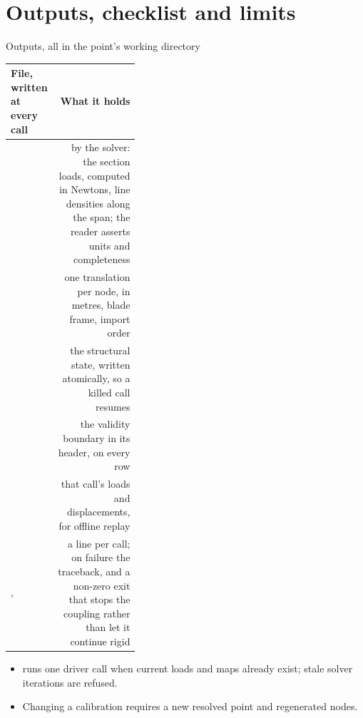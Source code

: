 %
%

\section{Outputs, checklist and limits}

\begin{frame}{Outputs, all in the point's working directory}
\relax %
{\ftstablesize\renewcommand{\arraystretch}{1.1}
\begin{tabularx}{\linewidth}{@{}P{0.36\linewidth}R@{}}
\toprule
\textbf{File, written at every call} & \textbf{What it holds} \\
\midrule
{} & by the solver: the section loads, computed in Newtons, line densities along the span; the reader asserts units and completeness \\
 & one translation per node, in metres, blade frame, import order \\
 & the structural state, written atomically, so a killed call resumes \\
 & the validity boundary in its header,  on every row \\
 & that call's loads and displacements, for offline replay \\
,  & a line per call; on failure the traceback, and a non-zero exit that stops the coupling rather than let it continue rigid \\
\bottomrule
\end{tabularx}}
\par\vspace{1mm}
\begin{itemize}\scriptsize
  \item {} runs one driver call when
        current loads and maps already exist; stale solver iterations are refused.
  \item Changing a calibration requires a new resolved point and regenerated
        nodes.
\end{itemize}
\end{frame}

